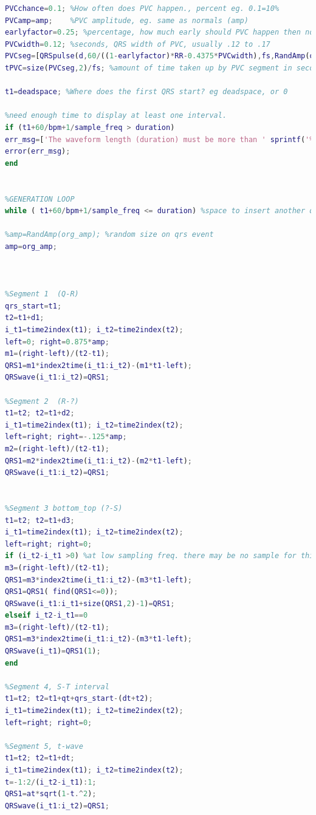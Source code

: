 \begin{lstlisting}[language=Matlab]
%Calculate PVC parameters and segment
PVCchance=0.1; %How often does PVC happen., percent eg. 0.1=10%
PVCamp=amp;    %PVC amplitude, eg. same as normals (amp)
earlyfactor=0.25; %percentage, how much early should PVC happen then normal RR interval
PVCwidth=0.12; %seconds, QRS width of PVC, usually .12 to .17
PVCseg=[QRSpulse(d,60/((1-earlyfactor)*RR-0.4375*PVCwidth),fs,RandAmp(org_amp)) QRSpulse(PVCwidth,bpm*(1-earlyfactor),fs,PVCamp) QRSpulse(d,bpm,fs, RandAmp(org_amp))]; %PVC segment
tPVC=size(PVCseg,2)/fs; %amount of time taken up by PVC segment in seconds

t1=deadspace; %Where does the first QRS start? eg deadspace, or 0

%need enough time to display at least one interval.
if (t1+60/bpm+1/sample_freq > duration)
err_msg=['The waveform length (duration) must be more than ' sprintf('%.2f%',t1+60/bpm+1/sample_freq) ' second(s) in order to display one QRS event.'];
error(err_msg);
end


%GENERATION LOOP
while ( t1+60/bpm+1/sample_freq <= duration) %space to insert another qrs pulse in time line

%amp=RandAmp(org_amp); %random size on qrs event
amp=org_amp;



%Segment 1  (Q-R)
qrs_start=t1;   
t2=t1+d1;
i_t1=time2index(t1); i_t2=time2index(t2);
left=0; right=0.875*amp;
m1=(right-left)/(t2-t1);
QRS1=m1*index2time(i_t1:i_t2)-(m1*t1-left);
QRSwave(i_t1:i_t2)=QRS1;

%Segment 2  (R-?)
t1=t2; t2=t1+d2;
i_t1=time2index(t1); i_t2=time2index(t2);
left=right; right=-.125*amp;
m2=(right-left)/(t2-t1);
QRS1=m2*index2time(i_t1:i_t2)-(m2*t1-left);
QRSwave(i_t1:i_t2)=QRS1;


%Segment 3 bottom_top (?-S) 
t1=t2; t2=t1+d3; 
i_t1=time2index(t1); i_t2=time2index(t2);
left=right; right=0;
if (i_t2-i_t1 >0) %at low sampling freq. there may be no sample for this segment
m3=(right-left)/(t2-t1);
QRS1=m3*index2time(i_t1:i_t2)-(m3*t1-left);
QRS1=QRS1( find(QRS1<=0));
QRSwave(i_t1:i_t1+size(QRS1,2)-1)=QRS1;
elseif i_t2-i_t1==0
m3=(right-left)/(t2-t1);
QRS1=m3*index2time(i_t1:i_t2)-(m3*t1-left);
QRSwave(i_t1)=QRS1(1);
end

%Segment 4, S-T interval
t1=t2; t2=t1+qt+qrs_start-(dt+t2);
i_t1=time2index(t1); i_t2=time2index(t2);
left=right; right=0;

%Segment 5, t-wave
t1=t2; t2=t1+dt;
i_t1=time2index(t1); i_t2=time2index(t2);
t=-1:2/(i_t2-i_t1):1;
QRS1=at*sqrt(1-t.^2);
QRSwave(i_t1:i_t2)=QRS1;


\end{lstlisting}
